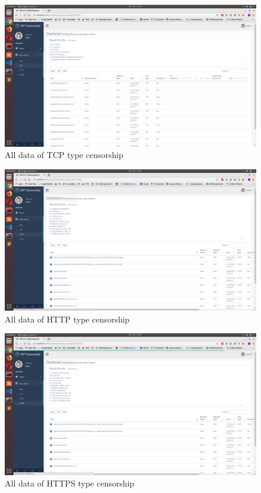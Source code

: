 \begin{figure}[h]
    \centering
    \includegraphics[width=\textwidth]{website/10tcpdetails.png}
    \caption{All data of TCP type censorship}
    \label{fig:web14}
\end{figure}

\begin{figure}[h]
    \centering
    \includegraphics[width=\textwidth]{website/11httpdetails.png}
    \caption{All data of HTTP type censorship}
    \label{fig:web15}
\end{figure}

\begin{figure}[h]
    \centering
    \includegraphics[width=\textwidth]{website/12httpsdetails.png}
    \caption{All data of HTTPS type censorship}
    \label{fig:web16}
\end{figure}